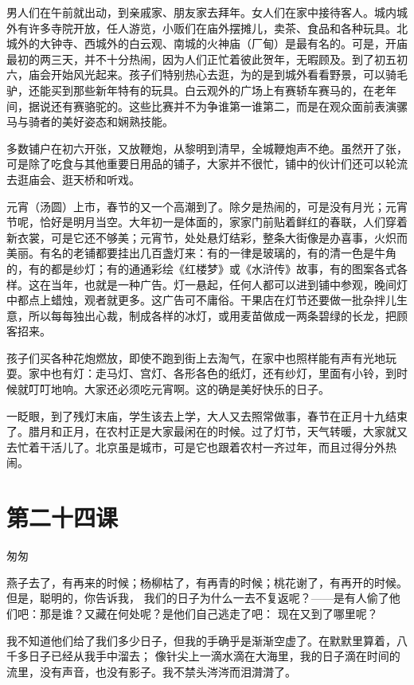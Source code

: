 \documentclass[12pt,UTF8]{ctexbook}
\begin{document}
男人们在午前就出动，到亲戚家、朋友家去拜年。女人们在家中接待客人。城内城外有许多寺院开放，任人游览，小贩们在庙外摆摊儿，卖茶、食品和各种玩具。北城外的大钟寺、西城外的白云观、南城的火神庙（厂甸）是最有名的。可是，开庙最初的两三天，并不十分热闹，因为人们正忙着彼此贺年，无暇顾及。到了初五初六，庙会开始风光起来。孩子们特别热心去逛，为的是到城外看看野景，可以骑毛驴，还能买到那些新年特有的玩具。白云观外的广场上有赛轿车赛马的，在老年间，据说还有赛骆驼的。这些比赛并不为争谁第一谁第二，而是在观众面前表演骡马与骑者的美好姿态和娴熟技能。

多数铺户在初六开张，又放鞭炮，从黎明到清早，全城鞭炮声不绝。虽然开了张，可是除了吃食与其他重要日用品的铺子，大家并不很忙，铺中的伙计们还可以轮流去逛庙会、逛天桥和听戏。

元宵（汤圆）上市，春节的又一个高潮到了。除夕是热闹的，可是没有月光；元宵节呢，恰好是明月当空。大年初一是体面的，家家门前贴着鲜红的春联，人们穿着新衣裳，可是它还不够美；元宵节，处处悬灯结彩，整条大街像是办喜事，火炽而美丽。有名的老铺都要挂出几百盏灯来：有的一律是玻璃的，有的清一色是牛角的，有的都是纱灯；有的通通彩绘《红楼梦》或《水浒传》故事，有的图案各式各样。这在当年，也就是一种广告。灯一悬起，任何人都可以进到铺中参观，晚间灯中都点上蜡烛，观者就更多。这广告可不庸俗。干果店在灯节还要做一批杂拌儿生意，所以每每独出心裁，制成各样的冰灯，或用麦苗做成一两条碧绿的长龙，把顾客招来。

孩子们买各种花炮燃放，即使不跑到街上去淘气，在家中也照样能有声有光地玩耍。家中也有灯：走马灯、宫灯、各形各色的纸灯，还有纱灯，里面有小铃，到时候就叮叮地响。大家还必须吃元宵啊。这的确是美好快乐的日子。

一眨眼，到了残灯末庙，学生该去上学，大人又去照常做事，春节在正月十九结束了。腊月和正月，在农村正是大家最闲在的时候。过了灯节，天气转暖，大家就又去忙着干活儿了。北京虽是城市，可是它也跟着农村一齐过年，而且过得分外热闹。

\section{第二十四课}

匆匆

燕子去了，有再来的时候；杨柳枯了，有再青的时候；桃花谢了，有再开的时候。但是，聪明的，你告诉我，
我们的日子为什么一去不复返呢？——是有人偷了他们吧：那是谁？又藏在何处呢？是他们自己逃走了吧：
现在又到了哪里呢？

我不知道他们给了我们多少日子，但我的手确乎是渐渐空虚了。在默默里算着，八千多日子已经从我手中溜去；
像针尖上一滴水滴在大海里，我的日子滴在时间的流里，没有声音，也没有影子。我不禁头涔涔而泪潸潸了。
\end{document}
